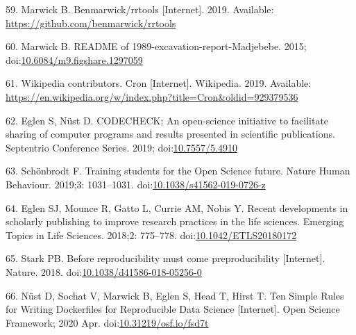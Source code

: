 \documentclass[10pt,letterpaper]{article}
\begin{document}
\leavevmode\hypertarget{ref-marwick_rrtools_2019}{}%
59. Marwick B. Benmarwick/rrtools {[}Internet{]}. 2019. Available:
\url{https://github.com/benmarwick/rrtools}

\leavevmode\hypertarget{ref-marwick_readme_2015}{}%
60. Marwick B. README of 1989-excavation-report-Madjebebe. 2015;
doi:\href{https://doi.org/10.6084/m9.figshare.1297059}{10.6084/m9.figshare.1297059}

\leavevmode\hypertarget{ref-wikipedia_contributors_cron_2019}{}%
61. Wikipedia contributors. Cron {[}Internet{]}. Wikipedia. 2019.
Available:
\url{https://en.wikipedia.org/w/index.php?title=Cron\&oldid=929379536}

\leavevmode\hypertarget{ref-eglen_codecheck_2019}{}%
62. Eglen S, Nüst D. CODECHECK: An open-science initiative to facilitate
sharing of computer programs and results presented in scientific
publications. Septentrio Conference Series. 2019;
doi:\href{https://doi.org/10.7557/5.4910}{10.7557/5.4910}

\leavevmode\hypertarget{ref-schonbrodt_training_2019}{}%
63. Schönbrodt F. Training students for the Open Science future. Nature
Human Behaviour. 2019;3: 1031--1031.
doi:\href{https://doi.org/10.1038/s41562-019-0726-z}{10.1038/s41562-019-0726-z}

\leavevmode\hypertarget{ref-eglen_recent_2018}{}%
64. Eglen SJ, Mounce R, Gatto L, Currie AM, Nobis Y. Recent developments
in scholarly publishing to improve research practices in the life
sciences. Emerging Topics in Life Sciences. 2018;2: 775--778.
doi:\href{https://doi.org/10.1042/ETLS20180172}{10.1042/ETLS20180172}

\leavevmode\hypertarget{ref-stark_before_2018}{}%
65. Stark PB. Before reproducibility must come preproducibility
{[}Internet{]}. Nature. 2018.
doi:\href{https://doi.org/10.1038/d41586-018-05256-0}{10.1038/d41586-018-05256-0}

\leavevmode\hypertarget{ref-nust_ten_2020}{}%
66. Nüst D, Sochat V, Marwick B, Eglen S, Head T, Hirst T. Ten Simple
Rules for Writing Dockerfiles for Reproducible Data Science
{[}Internet{]}. Open Science Framework; 2020 Apr.
doi:\href{https://doi.org/10.31219/osf.io/fsd7t}{10.31219/osf.io/fsd7t}

\nolinenumbers
\end{document}
